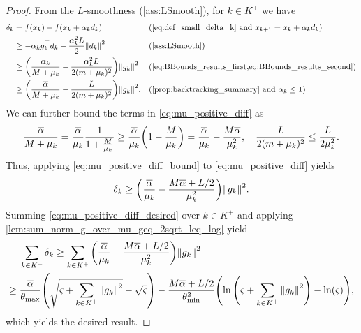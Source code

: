 \documentclass[journal]{subfiles}
\begin{document}
\begin{proof}
    From the $L$-smoothness (\cref{ass:LSmooth}), for $k \in K^+$ we have
    \begin{align}
        \delta_k & = f(x_k) - f(x_k + \alpha_{k} d_{k})                                                          &  & (\text{\cref{eq:def_small_delta_k} and } x_{{k}+1}=x_{k} + \alpha_{k} d_{k})      \notag \\
                 & \ge -\alpha_{k} g_{k}^\top d_{k} - \frac{\alpha_{k}^2 L}{2} \norm{d_{k}}^2                    &  & (\text{\cref{ass:LSmooth}})      \notag                                                  \\
                 & \ge \qty(\frac{\alpha_{k}}{M+\mu_{k}} - \frac{\alpha_{k}^2 L}{2(m+\mu_{k})^2}) \norm{g_{k}}^2 &  & (\text{\cref{eq:BBounds_results_first,eq:BBounds_results_second}}) \notag                \\
                 & \ge \qty(\frac{\overline{\alpha}}{M+\mu_{k}} - \frac{L}{2(m+\mu_{k})^2}) \norm{g_{k}}^2.      &  & (\text{\cref{prop:backtracking_summary} and $\alpha_k \leq 1$})
        \label{eq:mu_positive_diff}
    \end{align}
    We can further bound the terms in \cref{eq:mu_positive_diff} as
    \begin{equation}\label{eq:mu_positive_diff_bound}
        \frac{\overline{\alpha}}{M+\mu_{k}} = \frac{\overline{\alpha}}{\mu_{k}} \frac{1}{1+\frac{M}{\mu_{k}}} \geq \frac{\overline{\alpha}}{\mu_{k}} \qty(1-\frac{M}{\mu_{k}}) = \frac{\overline{\alpha}}{\mu_{k}} - \frac{M\overline{\alpha}}{\mu_{k}^2}, \quad
        \frac{L}{2(m+\mu_{k})^2} \le \frac{L}{2\mu_{k}^2}.
    \end{equation}
    Thus, applying \cref{eq:mu_positive_diff_bound} to \cref{eq:mu_positive_diff} yields
    \begin{equation}\label{eq:mu_positive_diff_desired}
        \delta_k \ge \qty(\frac{\overline{\alpha}}{\mu_{k}} - \frac{M\overline{\alpha}+L/2}{\mu_{k}^2}) \norm{g_{k}}^2.
    \end{equation}
    Summing \cref{eq:mu_positive_diff_desired} over $k \in K^+$ and applying \cref{lem:sum_norm_g_over_mu_geq_2sqrt_leq_log} yield
    \begin{align*}
              & \sum_{{k} \in K^+} \delta_k \ge \sum_{{k} \in K^+} \qty(\frac{\overline{\alpha}}{\mu_{k}} - \frac{M\overline{\alpha}+L/2}{\mu_{k}^2})\norm{g_{k}}^2                                                                                                 \\
        \ge{} & \frac{\overline{\alpha}}{\theta_{\max}} \qty(\sqrt{\varsigma + \sum_{{k} \in K^+} \norm{g_{k}}^2} - \sqrt{\varsigma}) - \frac{M\overline{\alpha}+L/2}{\theta_{\min}^2} \qty(\ln\qty(\varsigma+\sum_{{k} \in K^+} \norm{g_{k}}^2) - \ln(\varsigma)),
    \end{align*}
    which yields the desired result.
    \myQED
\end{proof}
\end{document}
